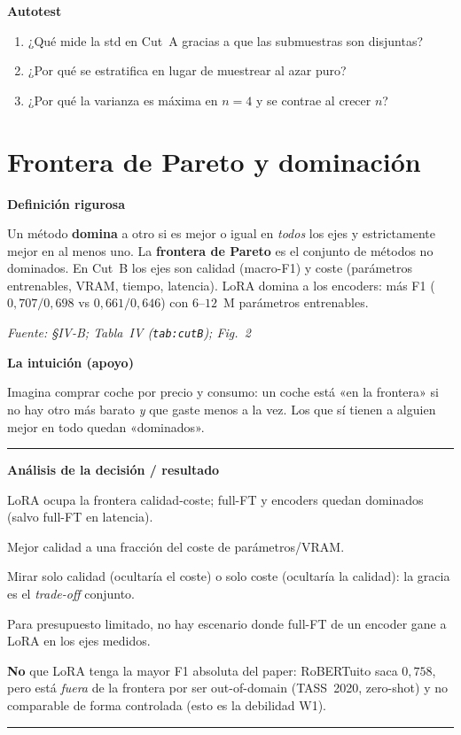 \documentclass[11pt,a4paper]{article}
\newcommand{\nivel}[1]{\medskip\noindent\textbf{\textcolor{blue!45!black}{#1}}\par\nopagebreak\smallskip}
\newcommand{\fuente}[1]{\nopagebreak\par\hfill{\footnotesize\textit{Fuente: #1}}\par}
\newenvironment{analisis}{%
  \medskip\par\noindent\rule{\linewidth}{0.4pt}\par\nopagebreak
  \textbf{Análisis de la decisión / resultado}\par\nopagebreak\smallskip
  \begin{description}[leftmargin=2.6cm,style=nextline,font=\bfseries]
}{%
  \end{description}\noindent\rule{\linewidth}{0.4pt}\par\medskip
}
\begin{document}
\nivel{Autotest}
\begin{enumerate}[nosep]
  \item ¿Qué mide la std en Cut~A gracias a que las submuestras son disjuntas?
  \item ¿Por qué se estratifica en lugar de muestrear al azar puro?
  \item ¿Por qué la varianza es máxima en $n{=}4$ y se contrae al crecer $n$?
\end{enumerate}

\section{Frontera de Pareto y dominación}\label{sec:pareto}

\nivel{Definición rigurosa}
Un método \textbf{domina} a otro si es mejor o igual en \emph{todos} los ejes y estrictamente mejor
en al menos uno. La \textbf{frontera de Pareto} es el conjunto de métodos no dominados. En Cut~B los
ejes son calidad (macro-F1) y coste (parámetros entrenables, VRAM, tiempo, latencia). LoRA domina a
los encoders: más F1 ($0{,}707/0{,}698$ vs $0{,}661/0{,}646$) con $6$--$12$~M parámetros entrenables.
\fuente{\S IV-B; Tabla~IV (\texttt{tab:cutB}); Fig.~2}

\nivel{La intuición (apoyo)}
Imagina comprar coche por precio y consumo: un coche está «en la frontera» si no hay otro más barato
\emph{y} que gaste menos a la vez. Los que sí tienen a alguien mejor en todo quedan «dominados».

\begin{analisis}
  \item[Qué] LoRA ocupa la frontera calidad-coste; full-FT y encoders quedan dominados (salvo full-FT
        en latencia).
  \item[Por qué] Mejor calidad a una fracción del coste de parámetros/VRAM.
  \item[Alternativas descartadas] Mirar solo calidad (ocultaría el coste) o solo coste (ocultaría la
        calidad): la gracia es el \emph{trade-off} conjunto.
  \item[Qué significa] Para presupuesto limitado, no hay escenario donde full-FT de un encoder gane a
        LoRA en los ejes medidos.
  \item[Qué NO significa] \textbf{No} que LoRA tenga la mayor F1 absoluta del paper: RoBERTuito saca
        $0{,}758$, pero está \emph{fuera} de la frontera por ser out-of-domain (TASS~2020, zero-shot)
        y no comparable de forma controlada (esto es la debilidad W1).
\end{analisis}
\end{document}
